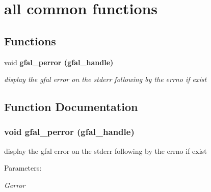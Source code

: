 \section{all common functions}
\label{group__common__group}
\subsection*{Functions}
\begin{CompactItemize}
\item 
void \bf{gfal\_\-perror} (gfal\_\-handle)
\begin{CompactList}\small\item\em display the gfal error on the stderr following by the errno if exist \item\end{CompactList}\end{CompactItemize}


\subsection{Function Documentation}
\subsubsection{\setlength{\rightskip}{0pt plus 5cm}void gfal\_\-perror (gfal\_\-handle)}\label{group__common__group_g21dc4cf2faa139b5813429eefb0c317a}


display the gfal error on the stderr following by the errno if exist 

\begin{Desc}
\item[Parameters:]
\begin{description}
\item[{\em Gerror}]\end{description}
\end{Desc}

